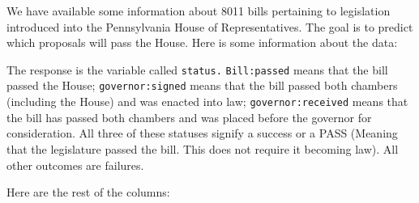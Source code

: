 \documentclass[]{article}
\begin{document}
We have available some information about 8011 bills pertaining to
legislation introduced into the Pennsylvania House of Representatives.
The goal is to predict which proposals will pass the House. Here is some
information about the data:

The response is the variable called \texttt{status.}
\texttt{Bill:passed} means that the bill passed the House;
\texttt{governor:signed} means that the bill passed both chambers
(including the House) and was enacted into law;
\texttt{governor:received} means that the bill has passed both chambers
and was placed before the governor for consideration. All three of these
statuses signify a success or a PASS (Meaning that the legislature
passed the bill. This does not require it becoming law). All other
outcomes are failures.

Here are the rest of the columns:
\end{document}
